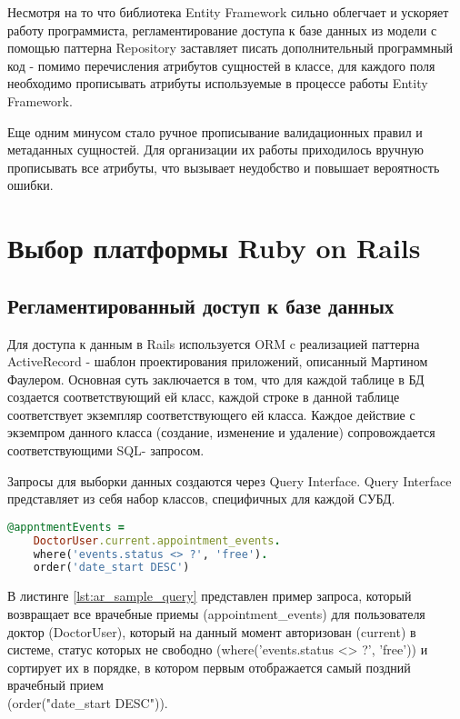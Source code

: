 Несмотря на то что библиотека Entity Framework сильно облегчает и ускоряет
работу программиста, регламентирование доступа к базе данных из модели с помощью
паттерна Repository заставляет писать дополнительный программный код - помимо
перечисления атрибутов сущностей в классе, для каждого поля  необходимо
прописывать атрибуты используемые в процессе работы Entity Framework.

Еще одним минусом стало ручное прописывание валидационных правил и метаданных сущностей. 
Для организации их работы приходилось вручную прописывать все атрибуты, что вызывает 
неудобство и повышает вероятность ошибки.

\section{Выбор платформы Ruby on Rails}
\subsection{Регламентированный доступ к базе данных}
Для доступа к данным в Rails используется ORM c реализацией паттерна
ActiveRecord - шаблон проектирования приложений, описанный Мартином Фаулером.
Основная суть заключается в том, что для каждой таблице в БД создается
соответствующий ей класс, каждой строке в данной таблице соответствует экземпляр
соответствующего ей класса. Каждое действие с экземпром данного класса
(создание, изменение и удаление) сопровождается соответствующими SQL- запросом.

Запросы для выборки данных создаются через Query Interface. Query Interface
представляет из себя набор классов, специфичных для каждой СУБД.

\begin{lstlisting}[language=Ruby,caption=Запрос через ActiveRecord,label={lst:ar_sample_query}] 
@appntmentEvents = 
	DoctorUser.current.appointment_events.
	where('events.status <> ?', 'free').
	order('date_start DESC')
\end{lstlisting}

В листинге \ref{lst:ar_sample_query} представлен пример запроса, который
возвращает все врачебные приемы (appointment\_events) для пользователя доктор (DoctorUser), 
который на данный момент авторизован (current)
в системе, статус которых не свободно (where('events.status <> ?', 'free')) и
сортирует их в порядке, в котором первым отображается самый поздний врачебный прием
\\ (order("date\_start DESC")).

